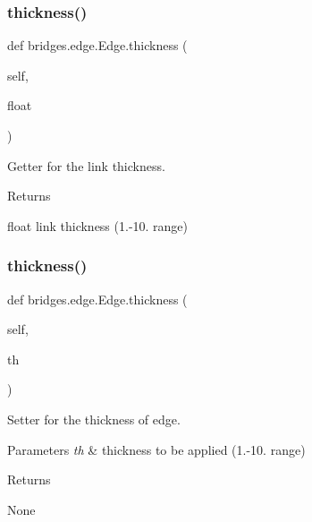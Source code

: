 \subsubsection{\texorpdfstring{thickness()}{thickness()}\hspace{0.1cm}{\footnotesize\ttfamily [1/2]}}
{\footnotesize\ttfamily def bridges.\+edge.\+Edge.\+thickness (\begin{DoxyParamCaption}\item[{}]{self,  }\item[{}]{float }\end{DoxyParamCaption})}



Getter for the link thickness. 

\begin{DoxyReturn}{Returns}


float link thickness (1.-\/10. range) 
\end{DoxyReturn}
\mbox{\label{classbridges_1_1edge_1_1_edge_a3137a2498d08d998471efde3bc1db1b4}} 
\subsubsection{\texorpdfstring{thickness()}{thickness()}\hspace{0.1cm}{\footnotesize\ttfamily [2/2]}}
{\footnotesize\ttfamily def bridges.\+edge.\+Edge.\+thickness (\begin{DoxyParamCaption}\item[{}]{self,  }\item[{}]{th }\end{DoxyParamCaption})}



Setter for the thickness of edge. 


\begin{DoxyParams}{Parameters}
{\em th} & thickness to be applied (1.-\/10. range) \\
\hline
\end{DoxyParams}
\begin{DoxyReturn}{Returns}


None 
\end{DoxyReturn}
\mbox{\label{classbridges_1_1edge_1_1_edge_a70e81381eaa6abafd0c40962326351a9}} 
